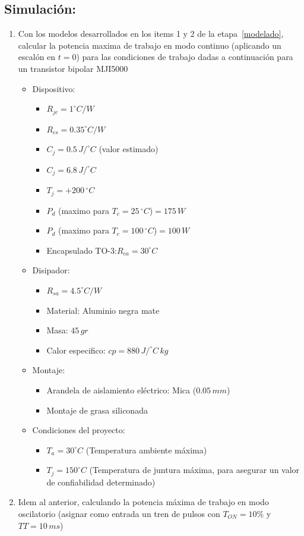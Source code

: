 \documentclass[10pt]{article}
\begin{document}
\subsection{Simulación:}
\begin{enumerate}
   \item Con los modelos desarrollados en los items 1 y 2 de la etapa~\ref{modelado}, calcular la potencia maxima de trabajo en modo continuo (aplicando un escalón en $t=0$) para las condiciones de trabajo dadas a continuación para un
      transistor bipolar MJI5000
      \begin{itemize}
         \item Dispositivo:
            \begin{itemize}
               \item $R_{jc}=1^{\circ}C/W$
               \item $R_{cs}=0.35^{\circ}C/W$
               \item $C_{j}=0.5\,J/^{\circ}C$ (valor estimado)
               \item $C_{j}=6.8\,J/^{\circ}C$
               \item $T_{j}=+200\,^{\circ}C$
               \item $P_{d}$ (maximo para $T_{c}=25\,^{\circ}C$)$=175\,W$
               \item $P_{d}$ (maximo para $T_{c}=100\,^{\circ}C$)$=100\,W$
               \item Encapsulado TO-3:$R_{ca}=30^{\circ}C$
            \end{itemize}
         \item Disipador:
            \begin{itemize}
               \item $R_{sa}=4.5^{\circ}C/W$
               \item Material: Aluminio negra mate
               \item Masa: $45\,gr$
               \item Calor especifico: $cp=880\,J/^{\circ}C\,kg$
            \end{itemize}
         \item Montaje:
            \begin{itemize}
               \item Arandela de aislamiento eléctrico: Mica ($0.05\,mm$)
               \item Montaje de grasa siliconada
            \end{itemize}
         \item Condiciones del proyecto:
            \begin{itemize}
               \item $T_{a}=30^{\circ}C$ (Temperatura ambiente máxima)
               \item $T_{j}=150^{\circ}C$ (Temperatura de juntura máxima, para asegurar un valor de confiabilidad determinado)
            \end{itemize}
      \end{itemize}
   \item Idem al anterior, calculando la potencia máxima de trabajo en modo oscilatorio (asignar como entrada un tren de pulsos con $T_{ON}=10\%$ y $TT=10\,ms$)
\end{enumerate}
\end{document}
